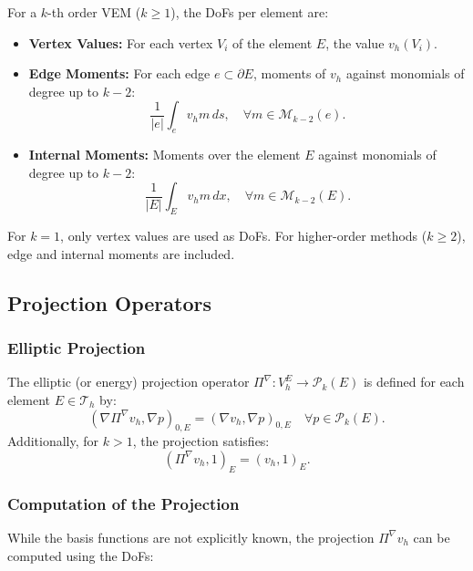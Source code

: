 \documentclass[class=article, crop=false]{standalone}
\begin{document}
For a $k$-th order VEM ($k \geq 1$), the DoFs per element are:

\begin{itemize}
    \item \textbf{Vertex Values:} For each vertex $V_i$ of the element $E$, the value $v_h(V_i)$.
    \item \textbf{Edge Moments:} For each edge $e \subset \partial E$, moments of $v_h$ against monomials of degree up to $k-2$:
    \[
    \frac{1}{|e|} \int_e v_h m \, ds, \quad \forall m \in \mathcal{M}_{k-2}(e).
    \]
    \item \textbf{Internal Moments:} Moments over the element $E$ against monomials of degree up to $k-2$:
    \[
    \frac{1}{|E|} \int_E v_h m \, dx, \quad \forall m \in \mathcal{M}_{k-2}(E).
    \]
\end{itemize}

For $k = 1$, only vertex values are used as DoFs. For higher-order methods ($k \geq 2$), edge and internal moments are included.

\subsection{Projection Operators}

\subsubsection{Elliptic Projection}

The elliptic (or energy) projection operator $\Pi^\nabla: V_h^E \rightarrow \mathcal{P}_k(E)$ is defined for each element $E \in \mathcal{T}_h$ by:
\begin{equation}
    (\nabla \Pi^\nabla v_h, \nabla p)_{0,E} = (\nabla v_h, \nabla p)_{0,E} \quad \forall p \in \mathcal{P}_k(E).
    \label{eq:elliptic_projection}
\end{equation}
Additionally, for $k > 1$, the projection satisfies:
\begin{equation}
    (\Pi^\nabla v_h, 1)_E = (v_h, 1)_E.
    \label{eq:projection_mean}
\end{equation}

\subsubsection{Computation of the Projection}

While the basis functions are not explicitly known, the projection $\Pi^\nabla v_h$ can be computed using the DoFs:
\end{document}
